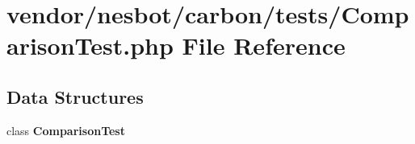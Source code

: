 \section{vendor/nesbot/carbon/tests/\+Comparison\+Test.php File Reference}
\label{_comparison_test_8php}
\subsection*{Data Structures}
\begin{DoxyCompactItemize}
\item 
class {\bf Comparison\+Test}
\end{DoxyCompactItemize}
